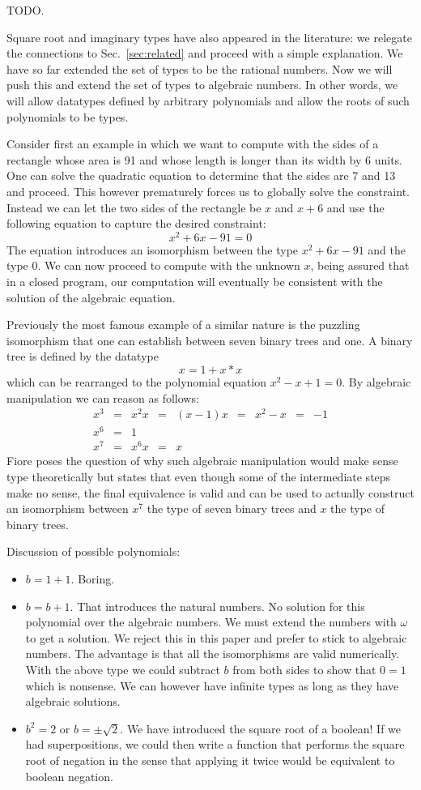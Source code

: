 \documentclass[preprint]{sigplanconf}
\begin{document}
TODO.

Square root and imaginary types have also appeared in the literature: we
relegate the connections to Sec.~\ref{sec:related} and proceed with a simple
explanation. We have so far extended the set of types to be the rational
numbers. Now we will push this and extend the set of types to algebraic
numbers. In other words, we will allow datatypes defined by arbitrary
polynomials and allow the roots of such polynomials to be types. 

Consider first an example in which we want to compute with the sides of a
rectangle whose area is 91 and whose length is longer than its width by 6
units. One can solve the quadratic equation to determine that the sides are 7
and 13 and proceed. This however prematurely forces us to globally solve the
constraint. Instead we can let the two sides of the rectangle be $x$ and
$x+6$ and use the following equation to capture the desired constraint:
\[
x^2 + 6x - 91 = 0
\]
The equation introduces an isomorphism between the type $x^2 + 6x - 91$ and
the type $0$. We can now proceed to compute with the unknown $x$, being
assured that in a closed program, our computation will eventually be
consistent with the solution of the algebraic equation. 

Previously the most famous example of a similar nature is the puzzling
isomorphism that one can establish between seven binary trees and one.
A binary tree is defined by the datatype
\[
x = 1 + x * x 
\]
which can be rearranged to the polynomial equation $x^2 - x + 1 = 0$. By
algebraic manipulation we can reason as follows:
\[\begin{array}{rclclclcl}
x^3 &=& x^2 x &=& (x-1) x &=& x^2 - x &=& -1 \\
x^6 &=& 1 \\
x^7 &=& x^6 x &=& x
\end{array}\]
Fiore poses the question of why such algebraic manipulation would make sense
type theoretically but states that even though some of the intermediate steps
make no sense, the final equivalence is valid and can be used to actually
construct an isomorphism between $x^7$ the type of seven binary trees 
and $x$ the type of binary trees.

Discussion of possible polynomials:
\begin{itemize}
\item $b=1+1$. Boring.
\item $b=b+1$. That introduces the natural numbers. No solution for this
  polynomial over the algebraic numbers. We must extend the numbers with
  $\omega$ to get a solution. We reject this in this paper and prefer to
  stick to algebraic numbers. The advantage is that all the isomorphisms are
  valid numerically. With the above type we could subtract $b$ from both
  sides to show that $0=1$ which is nonsense. We can however have infinite
  types as long as they have algebraic solutions.
\item $b^2=2$ or $b = \pm \sqrt{2}$. We have introduced the square root of a
  boolean! If we had superpositions, we could then write a function that
  performs the square root of negation in the sense that applying it twice
  would be equivalent to boolean negation.
\end{itemize}
\end{document}
